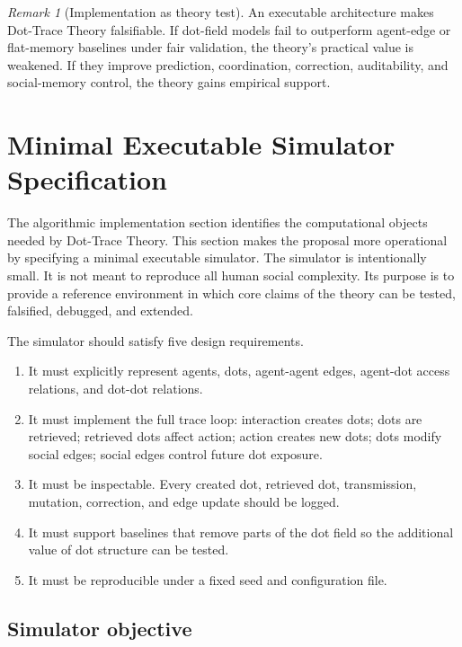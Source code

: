 \documentclass[11pt]{article}
\theoremstyle{remark}
\newtheorem{remark}{Remark}
\begin{document}
\begin{remark}[Implementation as theory test]
An executable architecture makes Dot-Trace Theory falsifiable. If
dot-field models fail to outperform agent-edge or flat-memory baselines
under fair validation, the theory's practical value is weakened. If they
improve prediction, coordination, correction, auditability, and
social-memory control, the theory gains empirical support.
\end{remark}

\section{Minimal Executable Simulator Specification}\label{minimal-executable-simulator-specification}

The algorithmic implementation section identifies the computational
objects needed by Dot-Trace Theory. This section makes the proposal more
operational by specifying a minimal executable simulator. The simulator
is intentionally small. It is not meant to reproduce all human social
complexity. Its purpose is to provide a reference environment in which
core claims of the theory can be tested, falsified, debugged, and
extended.

The simulator should satisfy five design requirements.

\begin{enumerate}[leftmargin=*]
\item It must explicitly represent agents, dots, agent-agent edges,
agent-dot access relations, and dot-dot relations.
\item It must implement the full trace loop: interaction creates dots;
dots are retrieved; retrieved dots affect action; action creates new
dots; dots modify social edges; social edges control future dot
exposure.
\item It must be inspectable. Every created dot, retrieved dot,
transmission, mutation, correction, and edge update should be logged.
\item It must support baselines that remove parts of the dot field so the
additional value of dot structure can be tested.
\item It must be reproducible under a fixed seed and configuration file.
\end{enumerate}

\subsection{Simulator objective}\label{simulator-objective}
\end{document}
